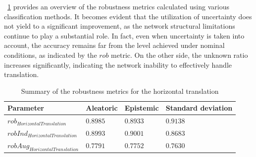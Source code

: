 \Tab~\ref{table:rob_ht} provides an overview of the robustness metrics calculated using various classification methods. It becomes evident that the utilization of uncertainty does not yield to a significant improvement, as the network structural limitations continue to play a substantial role. 
In fact, even when uncertainty is taken into account, the accuracy remains far from the level achieved under nominal conditions, as indicated by the $rob$ metric. On the other side, the unknown ratio increases significantly, indicating the network inability to effectively handle translation.

\begin{table}[h]
	\centering
	\begin{tabular}{|| l | l | l | l ||} 
		\hline
		\textbf{Parameter} & \textbf{Aleatoric} & \textbf{Epistemic} & \textbf{Standard deviation} \\
		\hline
		\hline
		$rob_{HorizontalTranslation}$ & $0.8985$ & $0.8933$ & $0.9138$ \\
		$robInd_{HorizontalTranslation}$ & $0.8993$ & $0.9001$ & $0.8683$ \\
		$robAug_{HorizontalTranslation}$ & $0.7791$ & $0.7752$ & $0.7630$ \\	
		\hline
	\end{tabular}	
	\caption{Summary of the robustness metrics for the horizontal translation}
	\label{table:rob_ht}
\end{table}